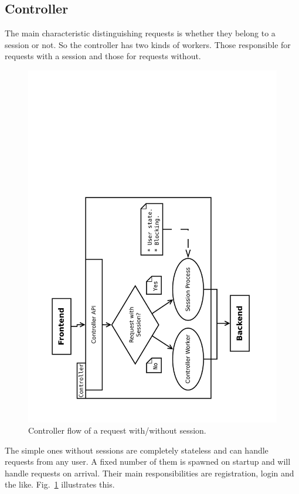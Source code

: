 \documentclass[11pt,a4paper]{report}
\begin{document}
\subsection{Controller}
The main characteristic distinguishing requests is whether they belong to a
session or not.
So the controller has two kinds of workers.
Those responsible for requests with a session and those for requests without.

\begin{figure}[h]
 \centering
 \includegraphics[width=13cm, angle=-90]{./graphics/Concurrency_-_session_proc.pdf}
 \vspace{-1cm}
 \caption{Controller flow of a request with/without session.}
 \label{fig:controller:session_proc}
\end{figure}

The simple ones without sessions are completely stateless and can handle
requests from any user.
A fixed number of them is spawned on startup and will handle requests on
arrival.
Their main responsibilities are registration, login and the like.
Fig.~\ref{fig:controller:session_proc} illustrates this.
\end{document}
